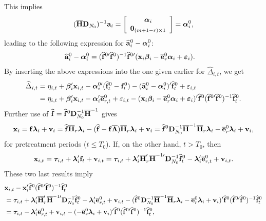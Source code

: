 \documentclass[12pt,fleqn]{article}
\begin{document}
This implies
\begin{align}
(\overline{\mathbf{H}}\mathbf{D}_{N_0})^{-1}\mathbf{a}_i = \left[\begin{array}{c} \boldsymbol{\alpha}_i \\
    \mathbf{0}_{(m+1-r)\times 1} \end{array}\right] = \boldsymbol{\alpha}_i^0,
\end{align}
leading to the following expression for $\widehat{\mathbf{a}}_i^0-\boldsymbol{\alpha}_i^0$:
\begin{align}
\widehat{\mathbf{a}}_i^0 - \boldsymbol{\alpha}_i^0 & = (\widehat{\mathbf{f}}^{0\prime}\widehat{\mathbf{f}}^0)^{-1}\widehat{\mathbf{f}}^{0\prime}(\mathbf{x}_{i}\boldsymbol{\beta}_i - \overline{\mathbf{e}}_{r}^0\boldsymbol{\alpha}_i +  \boldsymbol{\varepsilon}_{i} ).
\end{align}
By inserting the above expressions into the one given earlier for $\widehat \Delta_{i,t}$, we get
\begin{align}
\widehat \Delta_{i,t} & = \eta_{i,t} + \boldsymbol{\beta}_i'\mathbf{x}_{i,t} - \boldsymbol{\alpha}_i^{0\prime}(\widehat{\mathbf{f}}_t^0-\mathbf{f}_t^0) - (\widehat{\mathbf{a}}_i^{0} - \boldsymbol{\alpha}_i^0)'\widehat{\mathbf{f}}_t^0  + \varepsilon_{i,t}\notag\\
& = \eta_{i,t} + \boldsymbol{\beta}_i'\mathbf{x}_{i,t} - \boldsymbol{\alpha}_i'\overline{\mathbf{e}}_{r,t}^0 + \varepsilon_{i,t} - ( \mathbf{x}_{i}\boldsymbol{\beta}_i  - \overline{\mathbf{e}}_{r}^0\boldsymbol{\alpha}_i +  \boldsymbol{\varepsilon}_{i} )' \widehat{\mathbf{f}}^{0} (\widehat{\mathbf{f}}^{0\prime}\widehat{\mathbf{f}}^0)^{-1}\widehat{\mathbf{f}}_t^0  .
\end{align}
Further use of $\widehat{\mathbf{f}} = \widehat{\mathbf{f}}^0\mathbf{D}_{N_0}^{-1}\overline{\mathbf{H}}^{-1}$ gives
\begin{eqnarray}
\mathbf{x}_i = \mathbf{f}\boldsymbol{\lambda}_i + \mathbf{v}_i = \widehat{\mathbf{f}}\overline{\mathbf{H}}_{r}\boldsymbol{\lambda}_i -  (\widehat{\mathbf{f}} - \mathbf{f}\overline{\boldsymbol{\Lambda}})\overline{\mathbf{H}}_{r}\boldsymbol{\lambda}_i  + \mathbf{v}_i =  \widehat{\mathbf{f}}^0\mathbf{D}_{N_0}^{-1}\overline{\mathbf{H}}^{-1}\overline{\mathbf{H}}_{r}\boldsymbol{\lambda}_i  - \overline{\mathbf{e}}_{r}^0\boldsymbol{\lambda}_i  + \mathbf{v}_i ,
\end{eqnarray}
for pretreatment periods ($t \leq T_0$). If, on the other hand, $t > T_0$, then
\begin{eqnarray}
\mathbf{x}_{i,t} = \boldsymbol{\tau}_{i,t} + \boldsymbol{\lambda}_i'\mathbf{f}_t + \mathbf{v}_{i,t} =  \boldsymbol{\tau}_{i,t} + \boldsymbol{\lambda}_i' \overline{\mathbf{H}}_{r}'\overline{\mathbf{H}}^{-1\prime}\mathbf{D}_{N_0}^{-1}\widehat{\mathbf{f}}_t^0  - \boldsymbol{\lambda}_i'\overline{\mathbf{e}}_{r,t}^0  + \mathbf{v}_{i,t}.
\end{eqnarray}
These two last results imply
\begin{align}
& \mathbf{x}_{i,t} -  \mathbf{x}_{i}' \widehat{\mathbf{f}}^{0}(\widehat{\mathbf{f}}^{0\prime}\widehat{\mathbf{f}}^0)^{-1}\widehat{\mathbf{f}}_t^0 \notag\\
& = \boldsymbol{\tau}_{i,t} + \boldsymbol{\lambda}_i' \overline{\mathbf{H}}_{r}'\overline{\mathbf{H}}^{-1\prime}\mathbf{D}_{N_0}^{-1}\widehat{\mathbf{f}}_t^0  - \boldsymbol{\lambda}_i'\overline{\mathbf{e}}_{r,t}^0  + \mathbf{v}_{i,t} -  (\widehat{\mathbf{f}}^0\mathbf{D}_{N_0}^{-1}\overline{\mathbf{H}}^{-1}\overline{\mathbf{H}}_{r}\boldsymbol{\lambda}_i  - \overline{\mathbf{e}}_{r}^0\boldsymbol{\lambda}_i  + \mathbf{v}_i)' \widehat{\mathbf{f}}^{0}(\widehat{\mathbf{f}}^{0\prime}\widehat{\mathbf{f}}^0)^{-1}\widehat{\mathbf{f}}_t^0\notag\\
& = \boldsymbol{\tau}_{i,t}  - \boldsymbol{\lambda}_i'\overline{\mathbf{e}}_{r,t}^0  + \mathbf{v}_{i,t} -  ( - \overline{\mathbf{e}}_{r}^0\boldsymbol{\lambda}_i  + \mathbf{v}_i)' \widehat{\mathbf{f}}^{0}(\widehat{\mathbf{f}}^{0\prime}\widehat{\mathbf{f}}^0)^{-1}\widehat{\mathbf{f}}_t^0,
\end{align}
\end{document}
